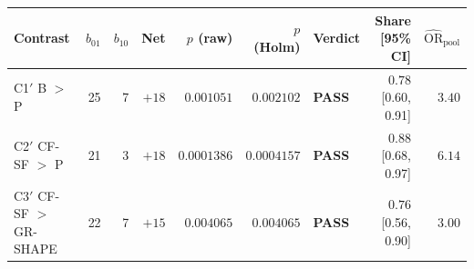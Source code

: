 \begin{tabular}{l r r r r r l r r}
\toprule
Contrast & $b_{01}$ & $b_{10}$ & Net & $p$ (raw) & $p$ (Holm) & Verdict & Share [95\% CI] & $\widehat{\mathrm{OR}}_{\mathrm{pool}}$ \\
\midrule
C1$'$ \quad B $>$ P & 25 & 7 & $+18$ & $0.001051$ & $0.002102$ & \textbf{PASS} & $0.78$ [0.60, 0.91] & $3.40$ \\
C2$'$ \quad CF-SF $>$ P & 21 & 3 & $+18$ & $0.0001386$ & $0.0004157$ & \textbf{PASS} & $0.88$ [0.68, 0.97] & $6.14$ \\
C3$'$ \quad CF-SF $>$ GR-SHAPE & 22 & 7 & $+15$ & $0.004065$ & $0.004065$ & \textbf{PASS} & $0.76$ [0.56, 0.90] & $3.00$ \\
\bottomrule
\end{tabular}
